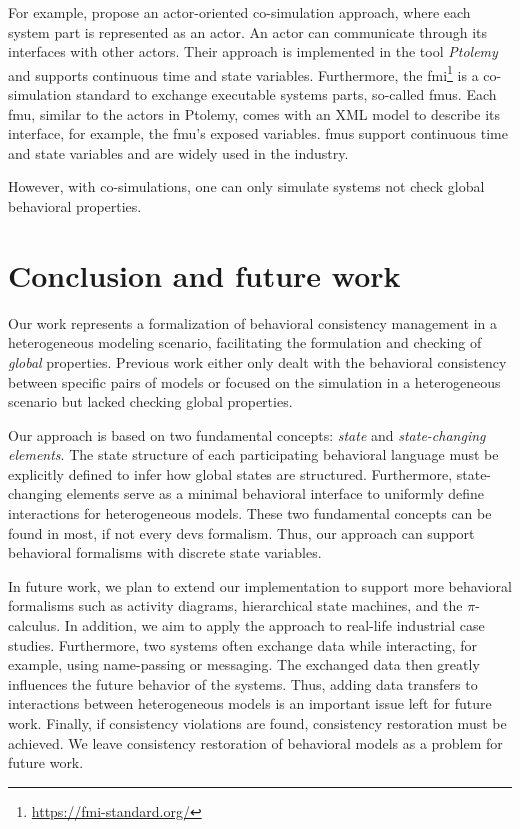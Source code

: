\documentclass{jot}
\begin{document}
For example, \cite{ekerTamingHeterogeneityPtolemy2003} propose an actor-oriented co-simulation approach, where each system part is represented as an actor.
An actor can communicate through its interfaces with other actors.
Their approach is implemented in the tool \textit{Ptolemy} and supports continuous time and state variables.
Furthermore, the \gls*{fmi}\footnote{\url{https://fmi-standard.org/}} is a co-simulation standard to exchange executable systems parts, so-called \glspl*{fmu}.
Each \gls*{fmu}, similar to the actors in Ptolemy, comes with an XML model to describe its interface, for example, the \gls*{fmu}'s exposed variables.
\glspl*{fmu} support continuous time and state variables and are widely used in the industry.

However, with co-simulations, one can only simulate systems not check global behavioral properties.

\section{Conclusion and future work} \label{sec:conclusion_and_future_work}
Our work represents a formalization of behavioral consistency management in a heterogeneous modeling scenario, facilitating the formulation and checking of \textit{global} properties.
Previous work either only dealt with the behavioral consistency between specific pairs of models or focused on the simulation in a heterogeneous scenario but lacked checking global properties.

Our approach is based on two fundamental concepts: \textit{state} and \textit{state-changing elements}.
The state structure of each participating behavioral language must be explicitly defined to infer how global states are structured.
Furthermore, state-changing elements serve as a minimal behavioral interface to uniformly define interactions for heterogeneous models.
These two fundamental concepts can be found in most, if not every \gls*{devs} formalism.
Thus, our approach can support behavioral formalisms with discrete state variables.

In future work, we plan to extend our implementation to support more behavioral formalisms such as activity diagrams, hierarchical state machines, and the $\pi$-calculus.
In addition, we aim to apply the approach to real-life industrial case studies.
Furthermore, two systems often exchange data while interacting, for example, using name-passing or messaging.
The exchanged data then greatly influences the future behavior of the systems.
Thus, adding data transfers to interactions between heterogeneous models is an important issue left for future work.
Finally, if consistency violations are found, consistency restoration must be achieved.
We leave consistency restoration of behavioral models as a problem for future work.
\end{document}
